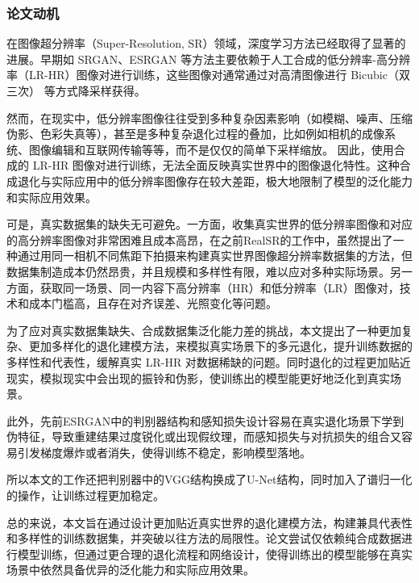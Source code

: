 \documentclass[12pt,AutoFakeBold]{article}
\begin{document}
\subsubsection{论文动机}


在图像超分辨率（Super-Resolution, SR）领域，深度学习方法已经取得了显著的进展。早期如 SRGAN、ESRGAN 等方法主要依赖于人工合成的低分辨率-高分辨率（LR-HR）图像对进行训练，这些图像对通常通过对高清图像进行 Bicubic（双三次） 等方式降采样获得。

然而，在现实中，低分辨率图像往往受到多种复杂因素影响（如模糊、噪声、压缩伪影、色彩失真等），甚至是多种复杂退化过程的叠加，比如例如相机的成像系统、图像编辑和互联⽹传输等等，而不是仅仅的简单下采样缩放。
因此，使用合成的 LR-HR 图像对进行训练，无法全面反映真实世界中的图像退化特性。这种合成退化与实际应用中的低分辨率图像存在较大差距，极大地限制了模型的泛化能力和实际应用效果。

可是，真实数据集的缺失无可避免。一方面，收集真实世界的低分辨率图像和对应的高分辨率图像对非常困难且成本高昂，在之前RealSR\cite{RealSR}的工作中，虽然提出了一种通过用同一相机不同焦距下拍摄来构建真实世界图像超分辨率数据集的方法，但数据集制造成本仍然昂贵，并且规模和多样性有限，难以应对多种实际场景。另一方面，获取同一场景、同一内容下高分辨率（HR）和低分辨率（LR）图像对，技术和成本门槛高，且存在对齐误差、光照变化等问题。

为了应对真实数据集缺失、合成数据集泛化能力差的挑战，本文提出了一种更加复杂、更加多样化的退化建模方法，来模拟真实场景下的多元退化，提升训练数据的多样性和代表性，缓解真实 LR-HR 对数据稀缺的问题。同时退化的过程更加贴近现实，模拟现实中会出现的振铃和伪影，使训练出的模型能更好地泛化到真实场景。

此外，先前ESRGAN\cite{ESRGAN}中的判别器结构和感知损失设计容易在真实退化场景下学到伪特征，导致重建结果过度锐化或出现假纹理，而感知损失与对抗损失的组合又容易引发梯度爆炸或者消失，使得训练不稳定，影响模型落地。

所以本文的工作还把判别器中的VGG结构换成了U-Net结构，同时加入了谱归一化的操作，让训练过程更加稳定。

总的来说，本文旨在通过设计更加贴近真实世界的退化建模方法，构建兼具代表性和多样性的训练数据集，并突破以往方法的局限性。论文尝试仅依赖纯合成数据进行模型训练，但通过更合理的退化流程和网络设计，使得训练出的模型能够在真实场景中依然具备优异的泛化能力和实际应用效果。
\end{document}
